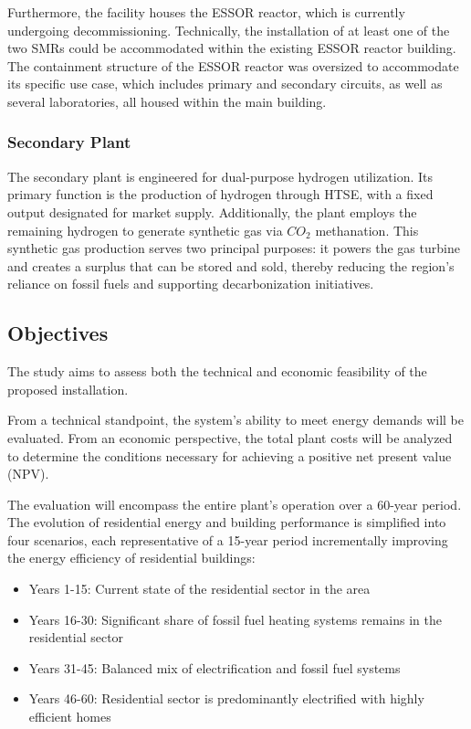 Furthermore, the facility houses the ESSOR reactor, which is currently undergoing decommissioning. Technically, the installation of at least one of the two SMRs could be accommodated within the existing ESSOR reactor building. The containment structure of the ESSOR reactor was oversized to accommodate its specific use case, which includes primary and secondary circuits, as well as several laboratories, all housed within the main building.

\subsubsection{Secondary Plant}
The secondary plant is engineered for dual-purpose hydrogen utilization. Its primary function is the production of hydrogen through HTSE, with a fixed output designated for market supply. Additionally, the plant employs the remaining hydrogen to generate synthetic gas via $CO_2$ methanation. This synthetic gas production serves two principal purposes: it powers the gas turbine and creates a surplus that can be stored and sold, thereby reducing the region's reliance on fossil fuels and supporting decarbonization initiatives.

\subsection{Objectives}
The study aims to assess both the technical and economic feasibility of the proposed installation.

From a technical standpoint, the system's ability to meet energy demands will be evaluated. From an economic perspective, the total plant costs will be analyzed to determine the conditions necessary for achieving a positive net present value (NPV).

The evaluation will encompass the entire plant's operation over a 60-year period. The evolution of residential energy and building performance is simplified into four scenarios, each representative of a 15-year period incrementally improving the energy efficiency of residential buildings:

\begin{itemize}
    \item Years 1-15:  Current state of the residential sector in the area
    \item Years 16-30: Significant share of fossil fuel heating systems remains in the residential sector
    \item Years 31-45: Balanced mix of electrification and fossil fuel systems
    \item Years 46-60: Residential sector is predominantly electrified with highly efficient homes
\end{itemize}


